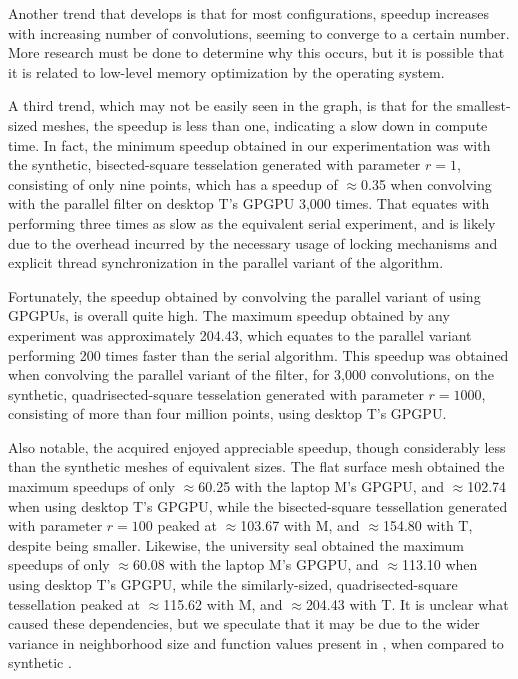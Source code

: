 Another trend that develops is that for most configurations, speedup increases with increasing number of convolutions, seeming to converge to a certain number. More research must be done to determine why this occurs, but it is possible that it is related to low-level memory optimization by the operating system.

A third trend, which may not be easily seen in the graph, is that for the smallest-sized meshes, the speedup is less than one, indicating a slow down in compute time. In fact, the minimum speedup obtained in our experimentation was with the synthetic, bisected-square tesselation generated with parameter $r=1$, consisting of only nine points, which has a speedup of $\approx$0.35 when convolving with the parallel filter on desktop T's \gls{GPGPU} 3,000 times. That equates with performing three times as slow as the equivalent serial experiment, and is likely due to the overhead incurred by the necessary usage of locking mechanisms and explicit thread synchronization in the parallel variant of the algorithm.

Fortunately, the speedup obtained by convolving the parallel variant of  using \glspl{GPGPU}, is overall quite high. The maximum speedup obtained by any experiment was approximately 204.43, which equates to the parallel variant performing 200 times faster than the serial algorithm. This speedup was obtained when convolving the parallel variant of the filter, for 3,000 convolutions, on the synthetic, quadrisected-square tesselation generated with parameter $r=1000$, consisting of more than four million points, using desktop T's \gls{GPGPU}.

Also notable, the acquired \tdd{} enjoyed appreciable speedup, though considerably less than the synthetic meshes of equivalent sizes. The flat surface mesh obtained the maximum speedups of only $\approx$60.25 with the laptop M's \gls{GPGPU}, and $\approx$102.74 when using desktop T's \gls{GPGPU}, while the bisected-square tessellation generated with parameter $r=100$ peaked at $\approx$103.67 with M, and $\approx$154.80 with T, despite being smaller. Likewise, the university seal obtained the maximum speedups of only $\approx$60.08 with the laptop M's \gls{GPGPU}, and $\approx$113.10 when using desktop T's \gls{GPGPU}, while the similarly-sized, quadrisected-square tessellation peaked at $\approx$115.62 with M, and $\approx$204.43 with T. It is unclear what caused these dependencies, but we speculate that it may be due to the wider variance in neighborhood size and function values present in \tdd{}, when compared to synthetic \tdd{}.

